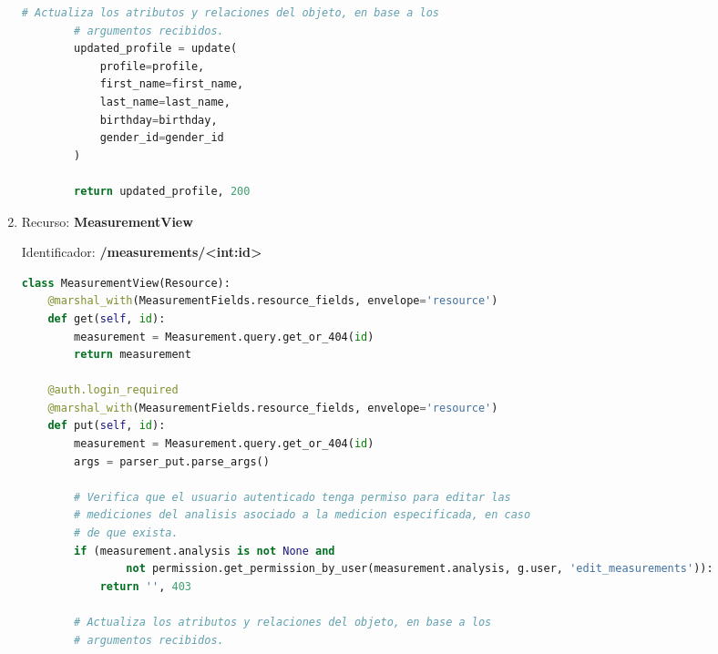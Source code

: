 \begin{enumerate}
\begin{lstlisting}[language=Python]
        # Actualiza los atributos y relaciones del objeto, en base a los
        # argumentos recibidos.
        updated_profile = update(
            profile=profile,
            first_name=first_name,
            last_name=last_name,
            birthday=birthday,
            gender_id=gender_id
        )

        return updated_profile, 200
\end{lstlisting}

\item Recurso: \textbf{MeasurementView}

Identificador: \textbf{/measurements/<int:id>}

\begin{lstlisting}[language=Python]
class MeasurementView(Resource):
    @marshal_with(MeasurementFields.resource_fields, envelope='resource')
    def get(self, id):
        measurement = Measurement.query.get_or_404(id)
        return measurement

    @auth.login_required
    @marshal_with(MeasurementFields.resource_fields, envelope='resource')
    def put(self, id):
        measurement = Measurement.query.get_or_404(id)
        args = parser_put.parse_args()

        # Verifica que el usuario autenticado tenga permiso para editar las
        # mediciones del analisis asociado a la medicion especificada, en caso
        # de que exista.
        if (measurement.analysis is not None and
                not permission.get_permission_by_user(measurement.analysis, g.user, 'edit_measurements')):
            return '', 403

        # Actualiza los atributos y relaciones del objeto, en base a los
        # argumentos recibidos.


\end{lstlisting}
\end{enumerate}
